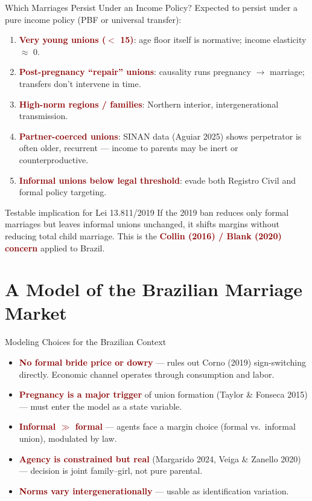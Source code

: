 \documentclass[aspectratio=169,10pt]{beamer}
\newcommand{\hl}[1]{\textcolor{darkred}{\textbf{#1}}}
\begin{document}
\begin{frame}{Which Marriages Persist Under an Income Policy?}
    Expected to persist under a pure income policy (PBF or universal transfer):
    \begin{enumerate}
        \item \hl{Very young unions ($<$ 15)}: age floor itself is normative; income elasticity $\approx$ 0.
        \item \hl{Post-pregnancy ``repair'' unions}: causality runs pregnancy $\rightarrow$ marriage; transfers don't intervene in time.
        \item \hl{High-norm regions / families}: Northern interior, intergenerational transmission.
        \item \hl{Partner-coerced unions}: SINAN data (Aguiar 2025) shows perpetrator is often older, recurrent --- income to parents may be inert or counterproductive.
        \item \hl{Informal unions below legal threshold}: evade both Registro Civil and formal policy targeting.
    \end{enumerate}

    \vspace{0.2cm}
    \begin{block}{Testable implication for Lei 13.811/2019}
        If the 2019 ban reduces only formal marriages but leaves informal unions unchanged, it shifts margins without reducing total child marriage. This is the \hl{Collin (2016) / Blank (2020) concern} applied to Brazil.
    \end{block}
\end{frame}

\section{A Model of the Brazilian Marriage Market}

\begin{frame}{Modeling Choices for the Brazilian Context}
    \begin{itemize}
        \item \hl{No formal bride price or dowry} --- rules out Corno (2019) sign-switching directly. Economic channel operates through consumption and labor.
        \item \hl{Pregnancy is a major trigger} of union formation (Taylor \& Fonseca 2015) --- must enter the model as a state variable.
        \item \hl{Informal $\gg$ formal} --- agents face a margin choice (formal vs.\ informal union), modulated by law.
        \item \hl{Agency is constrained but real} (Margarido 2024, Veiga \& Zanello 2020) --- decision is joint family--girl, not pure parental.
        \item \hl{Norms vary intergenerationally} --- usable as identification variation.
    \end{itemize}
\end{frame}
\end{document}
